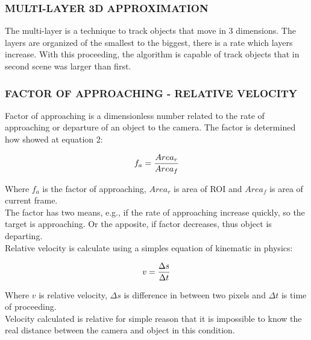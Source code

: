 \subsubsection{MULTI-LAYER 3D APPROXIMATION}
The multi-layer is a technique to track objects that move in 3 dimensions. The 
layers are organized of the smallest to the biggest, 
there is a rate which layers increase. With this proceeding, the algorithm is 
capable of track objects that in second scene was larger than first.\\


\subsubsection{FACTOR OF APPROACHING - RELATIVE VELOCITY}
Factor of approaching is a dimensionless number related to the rate of approaching 
or departure of an object to the camera. The factor
is determined how showed at equation 2:

\begin{equation}
\centering
\everymath{\displaystyle}
f_a = \frac{Area_r}{Area_f} 
\end{equation}

Where $f_a$ is the factor of approaching, $Area_r$ is area of ROI and $Area_f$ 
is area of current frame.\\
The factor has two means, e.g., if the rate of approaching increase quickly, so 
the target is approaching. Or the apposite, if factor decreases, thus 
object is departing.\\
Relative velocity is calculate using a simples equation of kinematic in physics:


\begin{equation}
\centering
\everymath{\displaystyle}
 v = \frac{\Delta s}{\Delta t}
\end{equation}

Where $v$ is relative velocity, $\Delta s$ is difference in between two pixels and 
$\Delta t$ is time of proceeding.\\
Velocity calculated is relative for simple reason that it is impossible to know 
the real distance between the camera and object in this
condition.\\
